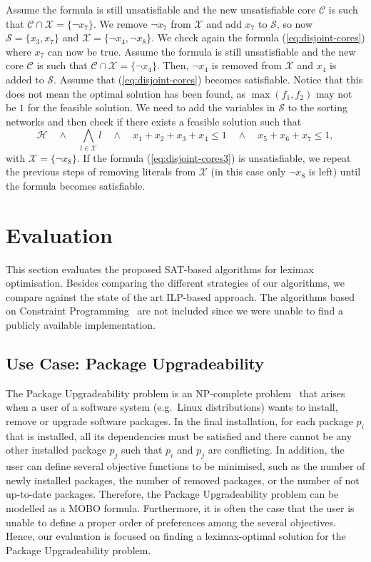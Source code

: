 \documentclass[a4paper,UKenglish,cleveref, autoref, thm-restate]{lipics-v2021}
\begin{document}
\begin{example}
Assume the formula is still unsatisfiable and the new unsatisfiable core $\mathcal{C}$ is such that $\mathcal{C}\cap\mathcal{X}=\{\neg x_7\}$.
We remove $\neg x_7$ from $\mathcal{X}$ and add $x_7$ to $\mathcal{S}$, so now $\mathcal{S}=\{x_3,x_7\}$ and $\mathcal{X} = \{\neg x_4,\neg x_8\}$.
We check again the formula (\ref{eq:disjoint-cores}) where $x_7$ can now be true.
Assume the formula is still unsatisfiable and the new core $\mathcal{C}$ is such that $\mathcal{C}\cap\mathcal{X}=\{\neg x_4\}$.
Then, $\neg x_4$ is removed from $\mathcal{X}$ and $x_4$ is added to $\mathcal{S}$.
Assume that (\ref{eq:disjoint-cores}) becomes satisfiable.
Notice that this does not mean the optimal solution has been found, as $\max(f_1,f_2)$ may not be $1$ for the feasible solution.
We need to add the variables in $\mathcal{S}$ to the sorting networks and then check if there exists a feasible solution such that
\begin{equation}
    \mathcal{H} \quad \wedge \quad \bigwedge_{l \in \mathcal{X}} l \quad \wedge \quad x_1 + x_2 + x_3 + x_4 \leq 1 \quad \wedge \quad x_5 + x_6 + x_7 \leq 1,\label{eq:disjoint-cores3}
\end{equation}
with $\mathcal{X} = \{\neg x_8\}$.
If the formula (\ref{eq:disjoint-cores3}) is unsatisfiable, we repeat the previous steps of removing literals from $\mathcal{X}$ (in this case only $\neg x_8$ is left) until the formula becomes satisfiable.
\end{example}  
\section{Evaluation}
\label{sec:evaluation}

This section evaluates the proposed SAT-based algorithms for leximax optimisation. Besides comparing the different strategies of our algorithms, we compare against the state of the art ILP-based approach.
The algorithms based on Constraint Programming~\cite{bouveret2009computing} are not included since we were unable to find a publicly available implementation.

\subsection{Use Case: Package Upgradeability}

The Package Upgradeability problem is an NP-complete problem~\cite{DiCosmo2006-NP} that arises when a user of a software system (e.g.\ Linux distributions) wants to install, remove or upgrade software packages. In the final installation, for each package $p_i$ that is installed, all its dependencies must be satisfied and there cannot be any other installed package $p_j$ such that $p_i$ and $p_j$ are conflicting.
In addition, the user can define several objective functions to be minimised, such as the number of newly installed packages, the number of removed packages, or the number of not up-to-date packages. Therefore, the Package Upgradeability problem can be modelled as a MOBO formula.
Furthermore, it is often the case that the user is unable to define a proper order of preferences among the several objectives. Hence, our evaluation is focused on finding a leximax-optimal solution for the Package Upgradeability problem.
\end{document}

